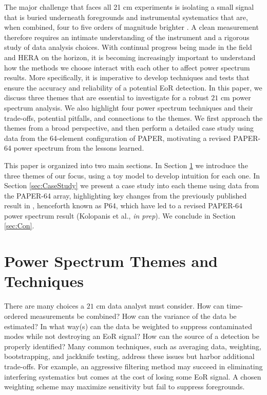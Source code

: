 \documentclass[preprint2,numberedappendix,tighten]{aastex6}  %
\begin{document}
The major challenge that faces all 21 cm experiments is isolating a small signal that is buried underneath foregrounds and 
instrumental systematics that are, when combined, four to five orders of magnitude brighter \citep[e.g.,][]{santos_et_al2005, ali_et_al2008, deOliveiraCosta_et_al2008, jelic_et_al2008, bernardi_et_al2009, bernardi_et_al2010, ghosh_et_al2011, pober_et_al2013, dillon_et_al2014, kohn_et_al2016}. A clean measurement therefore requires an intimate understanding of the instrument and a rigorous study of data analysis choices. With continual progress being made 
in the field and HERA on the horizon, it is becoming increasingly important to understand how the methods we choose interact 
with each other to affect power spectrum results. More specifically, it is imperative to develop techniques and tests that ensure 
the accuracy and reliability of a potential EoR detection. In this paper, we discuss three themes that are essential to investigate 
for a robust $21$ cm power spectrum analysis. We also highlight four power spectrum techniques and their trade-offs, potential 
pitfalls, and connections to the themes. We first approach the themes from a broad perspective, and then perform a detailed 
case study using data from the 64-element configuration of PAPER, motivating a revised PAPER-64 power spectrum 
from the lessons learned.

This paper is organized into two main sections. In Section \ref{sec:Themes} we introduce the three themes of our focus, using a 
toy model to develop intuition for each one. In Section \ref{sec:CaseStudy} we present a case study into each theme using data 
from the PAPER-64 array, highlighting key changes from the previously published result in \citet{ali_et_al2015}, henceforth known as P64, which have led to a 
revised PAPER-64 power spectrum result (Kolopanis et al., \textit{in prep}). We conclude in Section \ref{sec:Con}.


\section{Power Spectrum Themes and Techniques}
\label{sec:Themes}

There are many choices a $21$ cm data analyst must consider. How can time-ordered measurements be combined? How can the 
variance of the data be estimated? In what way(s) can the data be weighted to suppress contaminated modes while not 
destroying an EoR signal? How can the source of a detection be properly identified? Many common techniques, such as 
averaging data, weighting, bootstrapping, and jackknife testing, address these issues but harbor additional trade-offs. For 
example, an aggressive filtering method may succeed in eliminating interfering systematics but comes at the cost of losing 
some EoR signal. A chosen weighting scheme may maximize sensitivity but fail to suppress foregrounds. 
\end{document}
